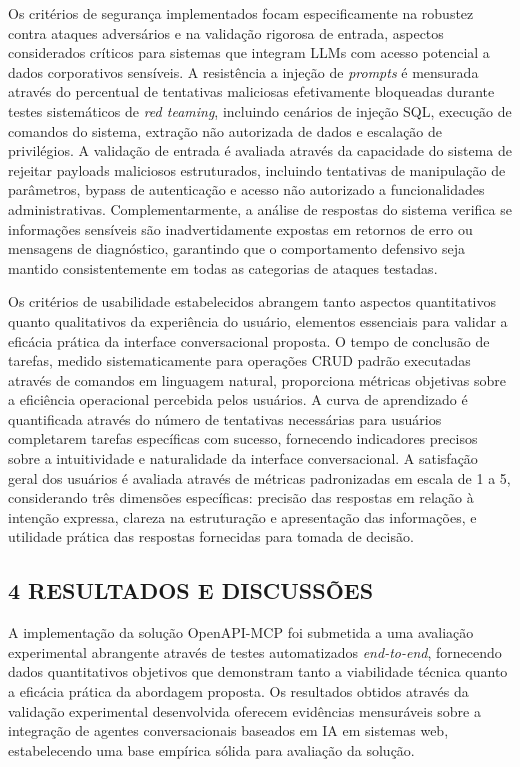 \documentclass[
]{article}
\begin{document}
Os critérios de segurança implementados focam especificamente na
robustez contra ataques adversários e na validação rigorosa de entrada,
aspectos considerados críticos para sistemas que integram LLMs com
acesso potencial a dados corporativos sensíveis. A resistência a injeção
de \emph{prompts} é mensurada através do percentual de tentativas
maliciosas efetivamente bloqueadas durante testes sistemáticos de
\emph{red teaming}, incluindo cenários de injeção SQL, execução de
comandos do sistema, extração não autorizada de dados e escalação de
privilégios. A validação de entrada é avaliada através da capacidade do
sistema de rejeitar payloads maliciosos estruturados, incluindo
tentativas de manipulação de parâmetros, bypass de autenticação e acesso
não autorizado a funcionalidades administrativas. Complementarmente, a
análise de respostas do sistema verifica se informações sensíveis são
inadvertidamente expostas em retornos de erro ou mensagens de
diagnóstico, garantindo que o comportamento defensivo seja mantido
consistentemente em todas as categorias de ataques testadas.

Os critérios de usabilidade estabelecidos abrangem tanto aspectos
quantitativos quanto qualitativos da experiência do usuário, elementos
essenciais para validar a eficácia prática da interface conversacional
proposta. O tempo de conclusão de tarefas, medido sistematicamente para
operações CRUD padrão executadas através de comandos em linguagem
natural, proporciona métricas objetivas sobre a eficiência operacional
percebida pelos usuários. A curva de aprendizado é quantificada através
do número de tentativas necessárias para usuários completarem tarefas
específicas com sucesso, fornecendo indicadores precisos sobre a
intuitividade e naturalidade da interface conversacional. A satisfação
geral dos usuários é avaliada através de métricas padronizadas em escala
de 1 a 5, considerando três dimensões específicas: precisão das
respostas em relação à intenção expressa, clareza na estruturação e
apresentação das informações, e utilidade prática das respostas
fornecidas para tomada de decisão.

\subsection{4 RESULTADOS E DISCUSSÕES}\label{resultados-e-discussuxf5es}

A implementação da solução OpenAPI-MCP foi submetida a uma avaliação
experimental abrangente através de testes automatizados
\emph{end-to-end}, fornecendo dados quantitativos objetivos que
demonstram tanto a viabilidade técnica quanto a eficácia prática da
abordagem proposta. Os resultados obtidos através da validação
experimental desenvolvida oferecem evidências mensuráveis sobre a
integração de agentes conversacionais baseados em IA em sistemas web,
estabelecendo uma base empírica sólida para avaliação da solução.
\end{document}
